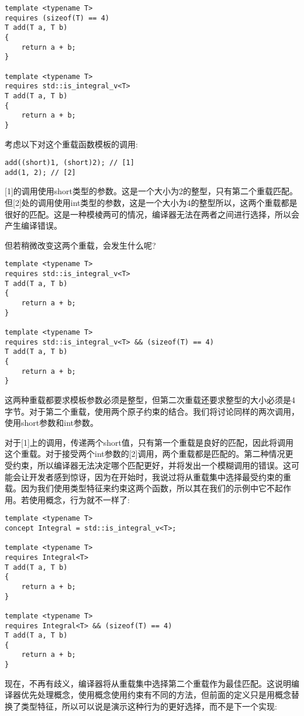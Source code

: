 \begin{lstlisting}[style=styleCXX]
template <typename T>
requires (sizeof(T) == 4)
T add(T a, T b)
{
	return a + b;
}

template <typename T>
requires std::is_integral_v<T>
T add(T a, T b)
{
	return a + b;
}
\end{lstlisting}

考虑以下对这个重载函数模板的调用:

\begin{lstlisting}[style=styleCXX]
add((short)1, (short)2); // [1]
add(1, 2); // [2]
\end{lstlisting}

[1]的调用使用short类型的参数。这是一个大小为2的整型，只有第二个重载匹配。但[2]处的调用使用int类型的参数，这是一个大小为4的整型所以，这两个重载都是很好的匹配。这是一种模棱两可的情况，编译器无法在两者之间进行选择，所以会产生编译错误。

但若稍微改变这两个重载，会发生什么呢?

\begin{lstlisting}[style=styleCXX]
template <typename T>
requires std::is_integral_v<T>
T add(T a, T b)
{
	return a + b;
}

template <typename T>
requires std::is_integral_v<T> && (sizeof(T) == 4)
T add(T a, T b)
{
	return a + b;
}
\end{lstlisting}

这两种重载都要求模板参数必须是整型，但第二次重载还要求整型的大小必须是4字节。对于第二个重载，使用两个原子约束的结合。我们将讨论同样的两次调用，使用short参数和int参数。

对于[1]上的调用，传递两个short值，只有第一个重载是良好的匹配，因此将调用这个重载。对于接受两个int参数的[2]调用，两个重载都是匹配的。第二种情况更受约束，所以编译器无法决定哪个匹配更好，并将发出一个模糊调用的错误。这可能会让开发者感到惊讶，因为在开始时，我说过将从重载集中选择最受约束的重载。因为我们使用类型特征来约束这两个函数，所以其在我们的示例中它不起作用。若使用概念，行为就不一样了:

\begin{lstlisting}[style=styleCXX]
template <typename T>
concept Integral = std::is_integral_v<T>;

template <typename T>
requires Integral<T>
T add(T a, T b)
{
	return a + b;
}

template <typename T>
requires Integral<T> && (sizeof(T) == 4)
T add(T a, T b)
{
	return a + b;
}
\end{lstlisting}

现在，不再有歧义，编译器将从重载集中选择第二个重载作为最佳匹配。这说明编译器优先处理概念，使用概念使用约束有不同的方法，但前面的定义只是用概念替换了类型特征，所以可以说是演示这种行为的更好选择，而不是下一个实现:

